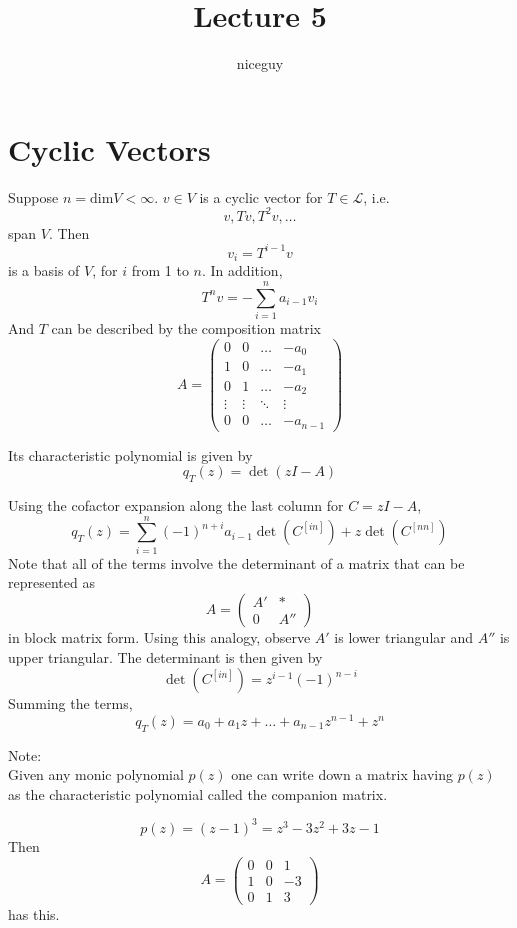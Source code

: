 \documentclass[12pt]{article}
\author{niceguy}
\title{Lecture 5}
\begin{document}
\maketitle

\section{Cyclic Vectors}

Suppose $n=\mathrm{dim}V<\infty$. $v\in V$ is a cyclic vector for $T\in\mathcal L$, i.e.
$$v,Tv,T^2v,\dots$$
span $V$. Then
$$v_i = T^{i-1}v$$
is a basis of $V$, for $i$ from 1 to $n$. In addition,
$$T^nv = -\sum_{i=1}^n a_{i-1}v_i$$
And $T$ can be described by the composition matrix
$$A = \begin{pmatrix} 0 & 0 & \dots & -a_0 \\ 1 & 0 & \dots & -a_1 \\ 0 & 1 & \dots & -a_2 \\ \vdots & \vdots & \ddots & \vdots \\ 0 & 0 & \dots & -a_{n-1}\end{pmatrix}$$

Its characteristic polynomial is given by
$$q_T(z) = \det(zI-A)$$

Using the cofactor expansion along the last column for $C=zI-A$,
$$q_T(z) = \sum_{i=1}^n (-1)^{n+i} a_{i-1}\det(C^{[in]}) + z\det(C^{[nn]})$$
Note that all of the terms involve the determinant of a matrix that can be represented as
$$A = \begin{pmatrix} A' & * \\ 0 & A''\end{pmatrix}$$
in block matrix form. Using this analogy, observe $A'$ is lower triangular and $A''$ is upper triangular. The determinant is then given by
$$\det(C^{[in]}) = z^{i-1}(-1)^{n-i}$$
Summing the terms,
$$q_T(z) = a_0 + a_1z +\dots+a_{n-1}z^{n-1} + z^n$$

Note: \\
Given any monic polynomial $p(z)$ one can write down a matrix having $p(z)$ as the characteristic polynomial called the companion matrix.

\begin{ex}
	$$p(z) = (z-1)^3 = z^3 -3z^2 + 3z - 1$$
	Then
	$$A = \begin{pmatrix} 0 & 0 & 1 \\ 1 & 0 & -3 \\ 0 & 1 & 3\end{pmatrix}$$
	has this.
\end{ex}
\end{document}
